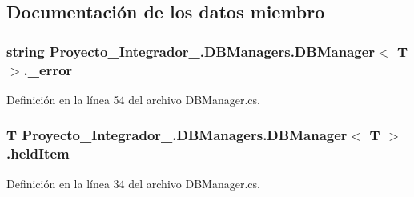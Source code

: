 \subsection{Documentación de los datos miembro}
\hypertarget{class_proyecto___integrador__3_1_1_d_b_managers_1_1_d_b_manager_3_01_t_01_4_a72ee684c84a301ba5a3c48f863bc950f}{
\subsubsection[{\-\_\-error}]{\setlength{\rightskip}{0pt plus 5cm}string Proyecto\-\_\-\-Integrador\-\_.\-D\-B\-Managers.\-D\-B\-Manager$<$ T $>$.\-\_\-error\hspace{0.3cm}{\ttfamily [private]}}}\label{class_proyecto___integrador__3_1_1_d_b_managers_1_1_d_b_manager_3_01_t_01_4_a72ee684c84a301ba5a3c48f863bc950f}


Definición en la línea 54 del archivo D\-B\-Manager.\-cs.

\hypertarget{class_proyecto___integrador__3_1_1_d_b_managers_1_1_d_b_manager_3_01_t_01_4_a3b67ae3b5b3b9c3793d56c1407d7dcff}{
\subsubsection[{held\-Item}]{\setlength{\rightskip}{0pt plus 5cm}T Proyecto\-\_\-\-Integrador\-\_.\-D\-B\-Managers.\-D\-B\-Manager$<$ T $>$.held\-Item\hspace{0.3cm}{\ttfamily [protected]}}}\label{class_proyecto___integrador__3_1_1_d_b_managers_1_1_d_b_manager_3_01_t_01_4_a3b67ae3b5b3b9c3793d56c1407d7dcff}


Definición en la línea 34 del archivo D\-B\-Manager.\-cs.

